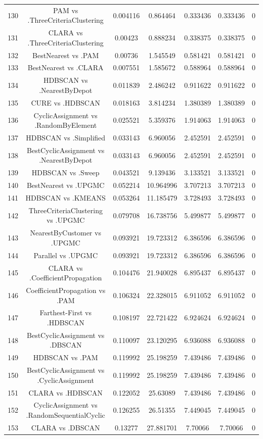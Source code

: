 \documentclass[a4paper,10pt]{article}
\begin{document}
\begin{landscape}
\begin{table}[!htp]
\begin{tabular}{ccccccc}
130&PAM vs .ThreeCriteriaClustering&0.004116&0.864464&0.333436&0.333436&0\\
131&CLARA vs .ThreeCriteriaClustering&0.00423&0.888234&0.338375&0.338375&0\\
132&BestNearest vs .PAM&0.00736&1.545549&0.581421&0.581421&0\\
133&BestNearest vs .CLARA&0.007551&1.585672&0.588964&0.588964&0\\
134&HDBSCAN vs .NearestByDepot&0.011839&2.486242&0.911622&0.911622&0\\
135&CURE vs .HDBSCAN&0.018163&3.814234&1.380389&1.380389&0\\
136&CyclicAssignment vs .RandomByElement&0.025521&5.359376&1.914063&1.914063&0\\
137&HDBSCAN vs .Simplified&0.033143&6.960056&2.452591&2.452591&0\\
138&BestCyclicAssignment vs .NearestByDepot&0.033143&6.960056&2.452591&2.452591&0\\
139&HDBSCAN vs .Sweep&0.043521&9.139436&3.133521&3.133521&0\\
140&BestNearest vs .UPGMC&0.052214&10.964996&3.707213&3.707213&0\\
141&HDBSCAN vs .KMEANS&0.053264&11.185479&3.728493&3.728493&0\\
142&ThreeCriteriaClustering vs .UPGMC&0.079708&16.738756&5.499877&5.499877&0\\
143&NearestByCustomer vs .UPGMC&0.093921&19.723312&6.386596&6.386596&0\\
144&Parallel vs .UPGMC&0.093921&19.723312&6.386596&6.386596&0\\
145&CLARA vs .CoefficientPropagation&0.104476&21.940028&6.895437&6.895437&0\\
146&CoefficientPropagation vs .PAM&0.106324&22.328015&6.911052&6.911052&0\\
147&Farthest-First vs .HDBSCAN&0.108197&22.721422&6.924624&6.924624&0\\
148&BestCyclicAssignment vs .DBSCAN&0.110097&23.120295&6.936088&6.936088&0\\
149&HDBSCAN vs .PAM&0.119992&25.198259&7.439486&7.439486&0\\
150&BestCyclicAssignment vs .CyclicAssignment&0.119992&25.198259&7.439486&7.439486&0\\
151&CLARA vs .HDBSCAN&0.122052&25.63089&7.439486&7.439486&0\\
152&CyclicAssignment vs .RandomSequentialCyclic&0.126255&26.51355&7.449045&7.449045&0\\
153&CLARA vs .DBSCAN&0.13277&27.881701&7.70066&7.70066&0\\

\end{tabular}
\end{table}
\end{landscape}
\end{document}
